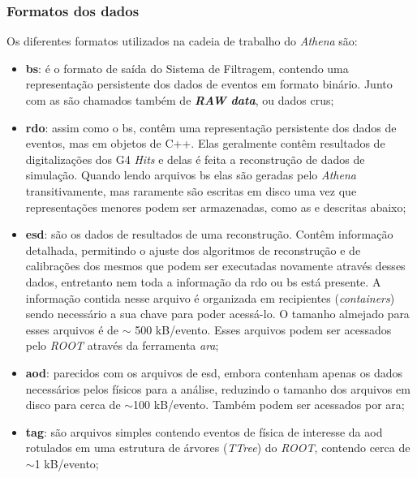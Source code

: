 \subsubsection{Formatos dos dados}
\label{sssec:athena_dados}

Os diferentes formatos \cite{atlaswb} utilizados na cadeia de trabalho do \emph{Athena}
são:


\begin{itemize}
\item \textbf{\gls{bs}}: é o formato de saída do Sistema de Filtragem, contendo
uma representação persistente dos dados de eventos em formato
binário. Junto com as  são chamados também de \textbf{\emph{RAW
data}}, ou dados crus;
\item \textbf{\gls{rdo}}: assim como o \gls{bs}, contêm uma representação persistente 
dos dados de eventos, mas em objetos de C++. Elas geralmente contêm resultados
de digitalizações dos G4 \emph{Hits} e delas é feita a reconstrução de dados de
simulação. Quando lendo arquivos \gls{bs} elas são geradas pelo \emph{Athena}
transitivamente, mas raramente são escritas em disco uma vez que representações
menores podem ser armazenadas, como as  e 
descritas abaixo;
\item \textbf{\gls{esd}}: são os dados de resultados de uma reconstrução. Contêm
informação detalhada, permitindo o ajuste dos algoritmos de reconstrução e
de calibrações dos mesmos que podem ser executadas novamente através desses dados, entretanto
nem toda a informação da \gls{rdo} ou \gls{bs} está presente. A
informação contida nesse arquivo é organizada em recipientes (\emph{containers})
sendo necessário a sua chave para poder acessá-lo. O tamanho almejado para esses
arquivos é de $\sim$ 500 kB/evento. Esses arquivos podem ser acessados pelo \emph{ROOT}
através da ferramenta \emph{ara};
\item \textbf{\gls{aod}}: parecidos com os arquivos de \gls{esd}, embora contenham
apenas os dados necessários pelos físicos para a análise, reduzindo o
tamanho dos arquivos em disco para cerca de $\sim$100 kB/evento. Também podem ser
acessados por \gls{ara};
\item \textbf{\gls{tag}}: são arquivos simples contendo eventos de física de
interesse da \gls{aod} rotulados em uma estrutura de árvores (\emph{TTree}) 
do \emph{ROOT}, contendo cerca de $\sim$1 kB/evento;
\end{itemize}

